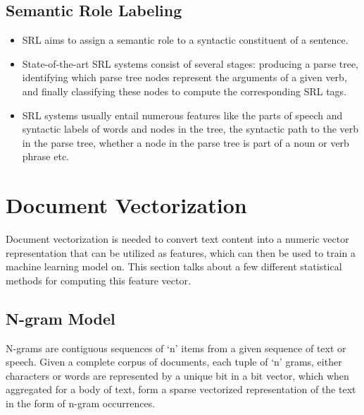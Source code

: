 \documentclass[11pt,a4paper]{article}
\begin{document}

  \subsection{Semantic Role Labeling} %
  \label{sub:semantic_role_labeling}

    \begin{itemize}
      \item
      SRL aims to assign a semantic role to a syntactic constituent of a sentence.
      \item
      State-of-the-art SRL systems consist of several stages: producing a parse tree, identifying which parse tree nodes represent the arguments of a given verb, and finally classifying these nodes to compute the corresponding SRL tags.
      \item
      SRL systems usually entail numerous features like the parts of speech and syntactic labels of words and nodes in the tree, the syntactic path to the verb in the parse tree, whether a node in the parse tree is part of a noun or verb phrase etc.
    \end{itemize}





\section{Document Vectorization} %
\label{sec:document_vectorization}

  Document vectorization is needed to convert text content into a numeric vector representation that can be utilized as features, which can then be used to train a machine learning model on. This section talks about a few different statistical methods for computing this feature vector\cite{SemEvalPaper}.

  \subsection{N-gram Model} %
  \label{sub:n_gram_model}
    N-grams are contiguous sequences of `n' items from a given sequence of text or speech. Given a complete corpus of documents, each tuple of `n' grams, either characters or words are represented by a unique bit in a bit vector, which when aggregated for a body of text, form a sparse vectorized representation of the text in the form of n-gram occurrences.
\end{document}
